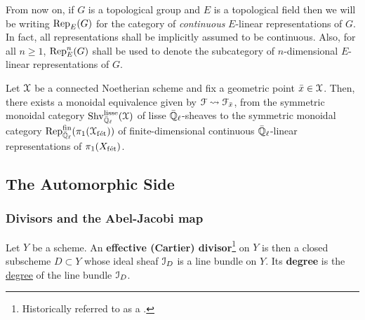             \begin{convention} \label{conv: continuous_linear_representations}
                From now on, if $G$ is a topological group and $E$ is a topological field then we will be writing $\mathrm{Rep}_E(G)$ for the category of \textit{continuous} $E$-linear representations of $G$. In fact, all representations shall be implicitly assumed to be continuous. Also, for all $n \geq 1$, $\mathrm{Rep}_E^n(G)$ shall be used to denote the subcategory of $n$-dimensional $E$-linear representations of $G$.
            \end{convention}
            \begin{theorem} \label{theorem: galois_representations_are_lisse_sheaves}
                \cite[Theorem 1.4.5.7]{conrad_etale_cohomology} Let $\mathcal{X}$ be a connected Noetherian scheme and fix a geometric point $\bar{x} \in \mathcal{X}$. Then, there exists a monoidal equivalence given by $\mathcal{F} \leadsto \mathcal{F}_{\bar{x}}$, from the symmetric monoidal category $\mathrm{Shv}_{\bar{\mathbb{Q}}_{\ell}}^{\mathrm{lisse}}(\mathcal{X})$ of lisse $\bar{\mathbb{Q}}_{\ell}$-sheaves to the symmetric monoidal category $\mathrm{Rep}_{\bar{\mathbb{Q}}_{\ell}}^{\mathrm{fin}}(\pi_1(\mathcal{X}_{\mathrm{f\acute{e}t}}))$ of finite-dimensional continuous $\bar{\mathbb{Q}}_{\ell}$-linear representations of $\pi_1(X_{\mathrm{f\acute{e}t}})$.
            \end{theorem}
            
    \subsection{The Automorphic Side}
    \subsubsection{Divisors and the Abel-Jacobi map}
        \begin{definition}[Divisors] \label{def: divisors}
            Let $Y$ be a scheme. An \textbf{effective (Cartier) divisor}\footnote{Historically referred to as a .} on $Y$ is then a closed subscheme $D \subset Y$ whose ideal sheaf $\mathcal{I}_D$ is a line bundle on $Y$. Its \textbf{degree} is the \href{https://stacks.math.columbia.edu/tag/0AYQ}{\underline{degree}} of the line bundle $\mathcal{I}_D$.  
        \end{definition}
        

